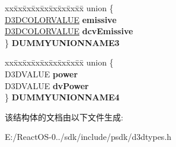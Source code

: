 \begin{DoxyCompactItemize}
\begin{tabbing}
\end{tabbing}\item 
\mbox{\label{struct___d3_d_m_a_t_e_r_i_a_l7_aa2bc473ac26033b441cf3e56e14c5ab0}} 
\begin{tabbing}
xx\=xx\=xx\=xx\=xx\=xx\=xx\=xx\=xx\=\kill
union \{\\
\>\hyperlink{struct___d3_d_c_o_l_o_r_v_a_l_u_e}{D3DCOLORVALUE} {\bfseries emissive}\\
\>\hyperlink{struct___d3_d_c_o_l_o_r_v_a_l_u_e}{D3DCOLORVALUE} {\bfseries dcvEmissive}\\
\} {\bfseries DUMMYUNIONNAME3}\\

\end{tabbing}\item 
\mbox{\label{struct___d3_d_m_a_t_e_r_i_a_l7_a06aece0f35cb419aa502556c14a32885}} 
\begin{tabbing}
xx\=xx\=xx\=xx\=xx\=xx\=xx\=xx\=xx\=\kill
union \{\\
\>D3DVALUE {\bfseries power}\\
\>D3DVALUE {\bfseries dvPower}\\
\} {\bfseries DUMMYUNIONNAME4}\\

\end{tabbing}\end{DoxyCompactItemize}


该结构体的文档由以下文件生成\+:\begin{DoxyCompactItemize}
\item 
E\+:/\+React\+O\+S-\/0../sdk/include/psdk/d3dtypes.\+h\end{DoxyCompactItemize}
